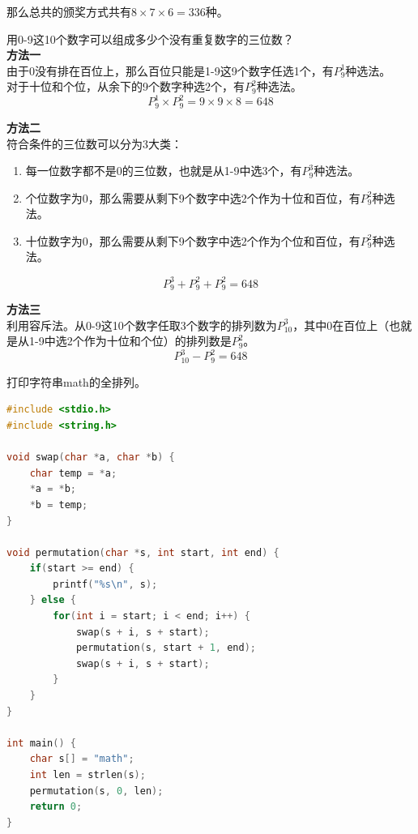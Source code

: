 \documentclass[12pt, openany, oneside]{book}
\begin{document}
那么总共的颁奖方式共有$ 8 \times 7 \times 6 = 336 $种。

\begin{tcolorbox}
	用0-9这10个数字可以组成多少个没有重复数字的三位数？\\

	\textbf{方法一}\\
	由于0没有排在百位上，那么百位只能是1-9这9个数字任选1个，有$ P_9^1 $种选法。\\
	对于十位和个位，从余下的9个数字种选2个，有$ P_9^2 $种选法。
	$$
		P_9^1 \times P_9^2 = 9 \times 9 \times 8 = 648
	$$

	\textbf{方法二}\\
	符合条件的三位数可以分为3大类：
	\begin{enumerate}
		\item 每一位数字都不是0的三位数，也就是从1-9中选3个，有$ P_9^3 $种选法。

		\item 个位数字为0，那么需要从剩下9个数字中选2个作为十位和百位，有$ P_9^2 $种选法。

		\item 十位数字为0，那么需要从剩下9个数字中选2个作为个位和百位，有$ P_9^2 $种选法。
	\end{enumerate}
	$$
		P_9^3 + P_9^2 + P_9^2 = 648
	$$

	\textbf{方法三}\\
	利用容斥法。从0-9这10个数字任取3个数字的排列数为$ P_{10}^3 $，其中0在百位上（也就是从1-9中选2个作为十位和个位）的排列数是$ P_9^2 $。
	$$
		P_{10}^3 - P_9^2 = 648
	$$
\end{tcolorbox}

\begin{tcolorbox}
	打印字符串math的全排列。
\end{tcolorbox}

\begin{lstlisting}[language=C, title=全排列]
#include <stdio.h>
#include <string.h>

void swap(char *a, char *b) {
	char temp = *a;
	*a = *b;
	*b = temp;
}

void permutation(char *s, int start, int end) {
	if(start >= end) {
		printf("%s\n", s);
	} else {
		for(int i = start; i < end; i++) {
			swap(s + i, s + start);
			permutation(s, start + 1, end);
			swap(s + i, s + start);
		}
	}
}

int main() {
	char s[] = "math";
	int len = strlen(s);
	permutation(s, 0, len);
	return 0;
}
\end{lstlisting}
\end{document}
